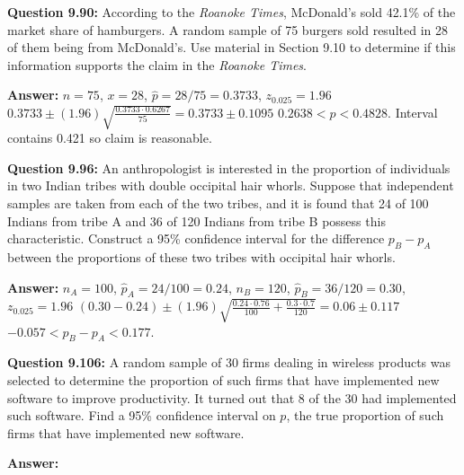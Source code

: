 \documentclass{article}
\begin{document}
\textbf{Question 9.90:}
According to the \textit{Roanoke Times}, McDonald’s
sold 42.1\% of the market share of hamburgers. A random 
sample of 75 burgers sold resulted in 28 of them
being from McDonald’s. Use material in Section 9.10
to determine if this information supports the claim in
the \textit{Roanoke Times}.
\begin{description}
    \item \textbf{Answer:} $n=75$, $x=28$, $\hat{p}=28/75=0.3733$, $z_{0.025}=1.96$\newline
    $0.3733\pm (1.96)\sqrt{\frac{0.3733\cdot 0.6267}{75}} = 0.3733\pm 0.1095$\newline
    \boldmath$0.2638<p<0.4828$. Interval contains 0.421 so claim is reasonable.
\end{description}

\textbf{Question 9.96:}
An anthropologist is interested in the proportion
of individuals in two Indian tribes with double 
occipital hair whorls. Suppose that independent samples are
taken from each of the two tribes, and it is found that
24 of 100 Indians from tribe A and 36 of 120 Indians
from tribe B possess this characteristic. Construct a
95\% confidence interval for the difference $p_B − p_A$ 
between the proportions of these two tribes with occipital
hair whorls.
\begin{description}
    \item \textbf{Answer:} $n_A=100$, $\hat{p}_A=24/100=0.24$, $n_B=120$, $\hat{p}_B=36/120=0.30$, $z_{0.025}=1.96$\newline
    $(0.30-0.24)\pm(1.96)\sqrt{\frac{0.24\cdot 0.76}{100}+\frac{0.3\cdot 0.7}{120}}=0.06\pm 0.117$\newline
    \boldmath$-0.057< p_B-p_A < 0.177$.
\end{description}

\textbf{Question 9.106:}
A random sample of 30 firms dealing in wireless
products was selected to determine the proportion of
such firms that have implemented new software to 
improve productivity. It turned out that 8 of the 30 had
implemented such software. Find a 95\% confidence 
interval on $p$, the true proportion of such firms that have
implemented new software.
\begin{description}
    \item \textbf{Answer:} 
\end{description}
\end{document}
